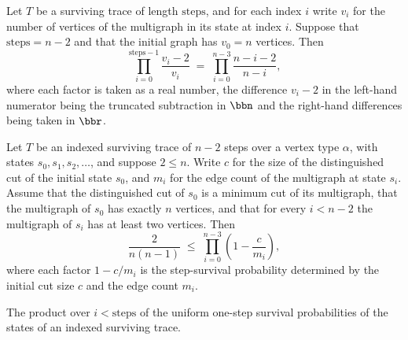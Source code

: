 \begin{lemma}
\label{KargerTrace.survivingTrace_factor_product_eq_telescope}
\leanok
{}
Let $T$ be a surviving trace of length $\text{steps}$, and for each index $i$ write
$v_i$ for the number of vertices of the multigraph in its state at index $i$. Suppose
that $\text{steps} = n - 2$ and that the initial graph has $v_0 = n$ vertices. Then
\[
  \prod_{i=0}^{\text{steps}-1} \frac{v_i - 2}{v_i}
  \;=\;
  \prod_{i=0}^{n-3} \frac{n - i - 2}{n - i},
\]
where each factor is taken as a real number, the difference $v_i - 2$ in the left-hand
numerator being the truncated subtraction in $\bbn$ and the right-hand differences being
taken in $\bbr$.
\end{lemma}

\begin{theorem}
\label{KargerTrace.survivingTrace_product_survival_lower_bound}
\leanok
{}
Let $T$ be an indexed surviving trace of $n-2$ steps over a vertex type $\alpha$, with
states $s_0, s_1, s_2, \ldots$, and suppose $2 \le n$. Write $c$ for the size of the
distinguished cut of the initial state $s_0$, and $m_i$ for the edge count of the
multigraph at state $s_i$. Assume that the distinguished cut of $s_0$ is a minimum cut
of its multigraph, that the multigraph of $s_0$ has exactly $n$ vertices, and that for
every $i < n-2$ the multigraph of $s_i$ has at least two vertices. Then
\[
  \frac{2}{n(n-1)} \;\le\; \prod_{i=0}^{n-3}\left(1 - \frac{c}{m_i}\right),
\]
where each factor $1 - c/m_i$ is the step-survival probability determined by the initial
cut size $c$ and the edge count $m_i$.
\end{theorem}

\begin{definition}
\label{KargerTrace.survivingTraceUniformSurvivalProduct}
\leanok
{}
The product over $i < \text{steps}$ of the uniform one-step survival probabilities of the
states of an indexed surviving trace.
\end{definition}

